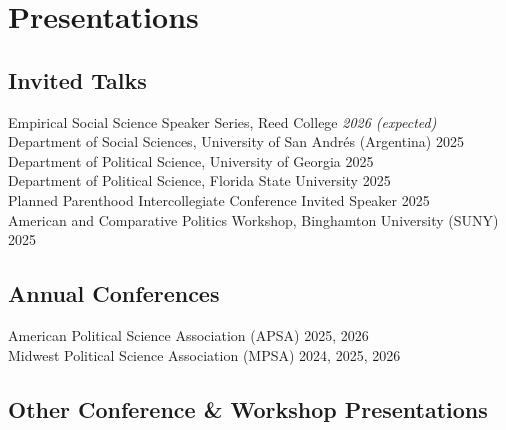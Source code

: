 \documentclass[11pt]{article}
\begin{document}
\section*{Presentations}

\subsection*{Invited Talks}
Empirical Social Science Speaker Series, Reed College \hfill \textit{2026 (expected)} \\
Department of Social Sciences, University of San Andrés (Argentina) \hfill 2025 \\
Department of Political Science, University of Georgia \hfill 2025 \\
Department of Political Science, Florida State University \hfill 2025 \\
Planned Parenthood Intercollegiate Conference Invited Speaker \hfill 2025 \\
American and Comparative Politics Workshop, Binghamton University (SUNY) \hfill 2025\\

\subsection*{Annual Conferences}
American Political Science Association (APSA) \hfill 2025, 2026 \\
Midwest Political Science Association (MPSA) \hfill 2024, 2025, 2026 \\

\subsection*{Other Conference \& Workshop Presentations}
\end{document}
